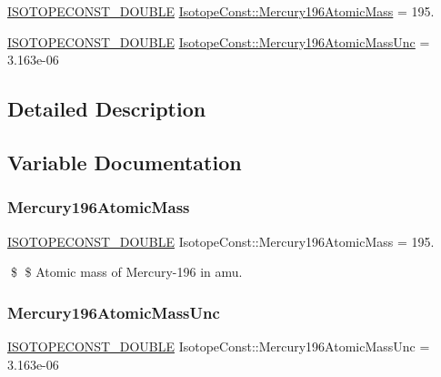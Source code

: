 \begin{DoxyCompactItemize}
\item 
\mbox{\hyperlink{group___isotope_const-_macros_ga8f45a7272ce02c0b4c65c44636ed719a}{I\+S\+O\+T\+O\+P\+E\+C\+O\+N\+S\+T\+\_\+\+D\+O\+U\+B\+LE}} \mbox{\hyperlink{group___isotope_const-_mercury-_hg196_gae0de1ac74547cb542f9f61168fd4bc8e}{Isotope\+Const\+::\+Mercury196\+Atomic\+Mass}} = 195.
\item 
\mbox{\hyperlink{group___isotope_const-_macros_ga8f45a7272ce02c0b4c65c44636ed719a}{I\+S\+O\+T\+O\+P\+E\+C\+O\+N\+S\+T\+\_\+\+D\+O\+U\+B\+LE}} \mbox{\hyperlink{group___isotope_const-_mercury-_hg196_ga75804d1d4fb2398e99b5a6fa0bda7db5}{Isotope\+Const\+::\+Mercury196\+Atomic\+Mass\+Unc}} = 3.\+163e-\/06
\end{DoxyCompactItemize}


\subsection{Detailed Description}


\subsection{Variable Documentation}
\mbox{\label{group___isotope_const-_mercury-_hg196_gae0de1ac74547cb542f9f61168fd4bc8e}} 
\subsubsection{\texorpdfstring{Mercury196\+Atomic\+Mass}{Mercury196AtomicMass}}
{\footnotesize\ttfamily \mbox{\hyperlink{group___isotope_const-_macros_ga8f45a7272ce02c0b4c65c44636ed719a}{I\+S\+O\+T\+O\+P\+E\+C\+O\+N\+S\+T\+\_\+\+D\+O\+U\+B\+LE}} Isotope\+Const\+::\+Mercury196\+Atomic\+Mass = 195.}

\$ \$ Atomic mass of Mercury-\/196 in amu. \mbox{\label{group___isotope_const-_mercury-_hg196_ga75804d1d4fb2398e99b5a6fa0bda7db5}} 
\subsubsection{\texorpdfstring{Mercury196\+Atomic\+Mass\+Unc}{Mercury196AtomicMassUnc}}
{\footnotesize\ttfamily \mbox{\hyperlink{group___isotope_const-_macros_ga8f45a7272ce02c0b4c65c44636ed719a}{I\+S\+O\+T\+O\+P\+E\+C\+O\+N\+S\+T\+\_\+\+D\+O\+U\+B\+LE}} Isotope\+Const\+::\+Mercury196\+Atomic\+Mass\+Unc = 3.\+163e-\/06}


